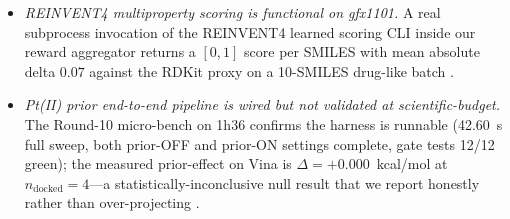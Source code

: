 \begin{itemize}
  \item \emph{REINVENT4 multiproperty scoring is functional on
  gfx1101.} A real subprocess invocation of the REINVENT4 learned
  scoring CLI inside our reward aggregator returns a $[0,1]$ score
  per SMILES with mean absolute delta $0.07$ against the RDKit proxy
  on a 10-SMILES drug-like batch \cite{footnote:wf_extra2}.
  \item \emph{Pt(II) prior end-to-end pipeline is wired but not
  validated at scientific-budget.} The Round-10 micro-bench on 1h36
  confirms the harness is runnable (42.60~s full sweep, both
  prior-OFF and prior-ON settings complete, gate tests 12/12 green);
  the measured prior-effect on Vina is $\Delta = +0.000$~kcal/mol at
  $n_{\text{docked}}=4$---a statistically-inconclusive null result
  that we report honestly rather than over-projecting
  \cite{footnote:round10_e2e}.
\end{itemize}

